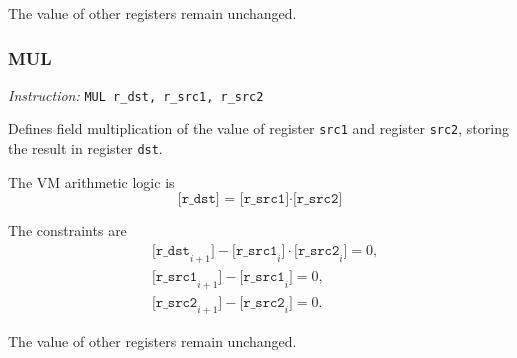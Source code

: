 The value of other registers remain unchanged.

\subsubsection{MUL}

\emph{Instruction:} \verb|MUL r_dst, r_src1, r_src2|

Defines field multiplication of the value of register \verb|src1| and register \verb|src2|, storing the result in register \verb|dst|.

The VM arithmetic logic is
\[ \texttt{[r\_dst] = [r\_src1]}\cdot\texttt{[r\_src2]} \]

The constraints are
\begin{align*}
    & \texttt{[r\_dst}_{i+1}\texttt{]} - \texttt{[r\_src1}_i\texttt{]}\cdot\texttt{[r\_src2}_i\texttt{]} = 0, \\
    & \texttt{[r\_src1}_{i+1}\texttt{]} - \texttt{[r\_src1}_i\texttt{]} = 0, \\
    & \texttt{[r\_src2}_{i+1}\texttt{]} - \texttt{[r\_src2}_i\texttt{]} = 0.
\end{align*}

The value of other registers remain unchanged.
